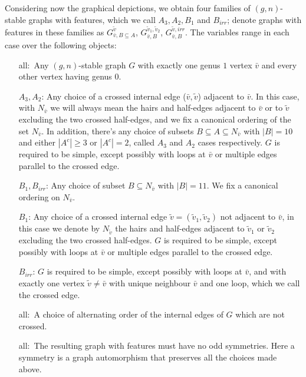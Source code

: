Considering now the graphical depictions, we obtain four families of $(g,n)$-stable graphs with features, which we call $A_3,A_2,B_1$ and $B_{irr}$; denote graphs with features in these families as $G_{\bar{v},B\subseteq A}^{\tilde{v}}$, $G_{\bar{v},B}^{\tilde{v}_1,\tilde{v}_2}$, $G_{\bar{v},B}^{\tilde{v},irr}$. The variables range in each case over the following objects:
\begin{enumerate}
    \item[all:\, ] Any $(g,n)$-stable graph $G$ with exactly one genus $1$ vertex $\bar{v}$ and every other vertex having genus $0$.
    \item[$A_3,A_2$: ] Any choice of a crossed internal edge ($\bar{v},\tilde{v}$) adjacent to $\bar{v}$. In this case, with $N_{\bar{v}}$ we will always mean the hairs and half-edges adjacent to $\bar{v}$ or to $\tilde{v}$ excluding the two crossed half-edges, and we fix a canonical ordering of the set $N_{\bar{v}}$. In addition, there's any choice of subsets $B\subseteq A\subseteq N_{\bar{v}}$ with $|B|=10$ and either $|A^c|\geq 3$ or $|A^c|=2$, called $A_3$ and $A_2$ cases respectively. $G$ is required to be simple, except possibly with loops at $\bar{v}$ or multiple edges parallel to the crossed edge.
    \item[$B_1,B_{irr}$: ] Any choice of subset $B\subseteq N_{\bar{v}}$ with $|B|=11$.  We fix a canonical ordering on $N_{\bar{v}}$.
    \item[$B_1$:] Any choice of a crossed internal edge $\tilde{v}=(\tilde{v}_1,\tilde{v}_2)$ not adjacent to $\bar{v}$, in this case we denote by $N_{\tilde{v}}$ the hairs and half-edges adjacent to $\tilde{v}_1$ or $\tilde{v}_2$ excluding the two crossed half-edges. $G$ is required to be simple, except possibly with loops at $\bar{v}$ or multiple edges parallel to the crossed edge.
    \item[$B_{irr}$:] $G$ is required to be simple, except possibly with loops at $\bar{v}$, and with exactly one vertex $\tilde{v}\neq\bar{v}$ with unique neighbour $\bar{v}$ and one loop, which we call the crossed edge.
    \item[all:\,] A choice of alternating order of the internal edges of $G$ which are not crossed.
    \item[all:\,] The resulting graph with features must have no odd symmetries. Here a symmetry is a graph automorphism that preserves all the choices made above.
\end{enumerate}

